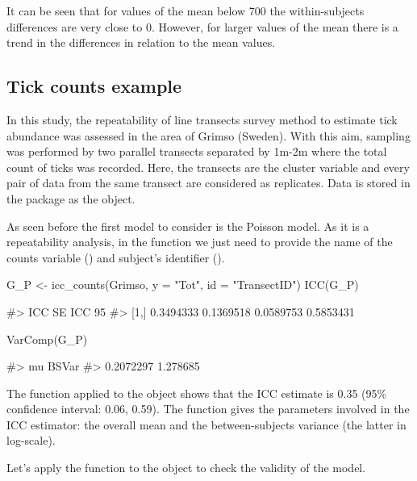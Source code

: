 It can be seen that for values of the mean below 700 the within-subjects
differences are very close to 0. However, for larger values of the mean
there is a trend in the differences in relation to the mean values.

\hypertarget{tick-counts-example}{%
\subsection{Tick counts example}\label{tick-counts-example}}

In this study, the repeatability of line transects survey method to
estimate tick abundance was assessed \citep{Pia2021} in the area of
Grimso (Sweden). With this aim, sampling was performed by two parallel
transects separated by 1m-2m where the total count of ticks was
recorded. Here, the transects are the cluster variable and every pair of
data from the same transect are considered as replicates. Data is stored
in the package as the  object.

As seen before the first model to consider is the Poisson model. As it
is a repeatability analysis, in the  function we just
need to provide the name of the counts variable () and
subject's identifier ().

\begin{Schunk}
\begin{Sinput}
G_P <- icc_counts(Grimso, y = "Tot", id = "TransectID")
ICC(G_P)
\end{Sinput}
\begin{Soutput}
#>            ICC    SE ICC 95% CI LL 95% CI UL
#> [1,] 0.3494333 0.1369518 0.0589753 0.5853431
\end{Soutput}
\begin{Sinput}
VarComp(G_P)
\end{Sinput}
\begin{Soutput}
#>         mu    BSVar
#>  0.2072297 1.278685
\end{Soutput}
\end{Schunk}

The function  applied to the  object shows that the
ICC estimate is 0.35 (95\% confidence interval: 0.06, 0.59). The
function  gives the parameters involved in the ICC
estimator: the overall mean and the between-subjects variance (the
latter in log-scale).

Let's apply the function  to the  object to
check the validity of the model.

